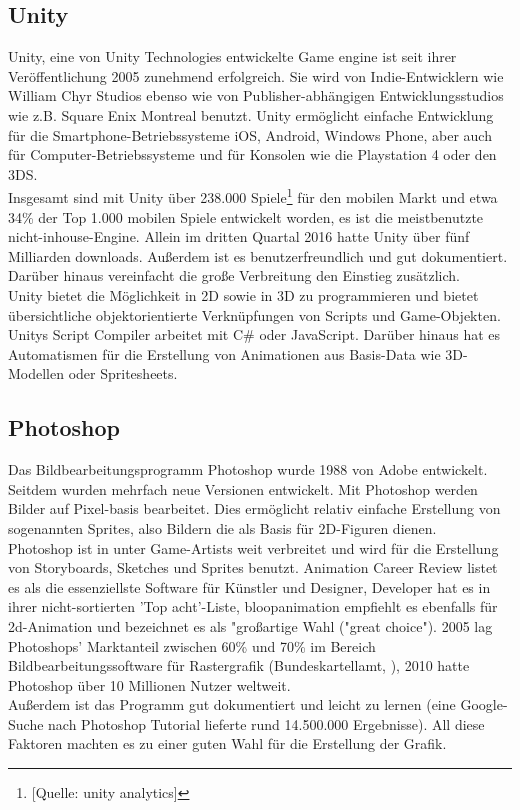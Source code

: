 \documentclass[extern,palatino]{cgBA}
\begin{document}
\subsection{Unity}
Unity, eine von Unity Technologies entwickelte Game engine ist seit ihrer Veröffentlichung 2005 zunehmend erfolgreich. %
Sie wird von Indie-Entwicklern wie William Chyr Studios ebenso wie von Publisher-abhängigen Entwicklungsstudios wie z.B. Square Enix Montreal benutzt. Unity ermöglicht einfache Entwicklung für die Smartphone-Betriebssysteme iOS, Android, Windows Phone, aber auch für Computer-Betriebssysteme und für Konsolen wie die Playstation 4 oder den 3DS.
\\Insgesamt sind mit Unity über 238.000 Spiele\footnote{[Quelle: unity analytics]} für den mobilen Markt %
und etwa 34\% der Top 1.000 mobilen Spiele entwickelt worden, es ist die meistbenutzte nicht-inhouse-Engine. Allein im dritten Quartal 2016 hatte Unity über fünf Milliarden downloads. Außerdem ist es benutzerfreundlich und gut dokumentiert. Darüber hinaus vereinfacht die große Verbreitung den Einstieg zusätzlich.
\\Unity bietet die Möglichkeit in 2D sowie in 3D zu programmieren und bietet übersichtliche objektorientierte Verknüpfungen von Scripts und Game-Objekten. Unitys Script Compiler arbeitet mit C\# oder JavaScript. Darüber hinaus hat es Automatismen für die Erstellung von Animationen aus Basis-Data wie 3D-Modellen oder Spritesheets. 
\newpage 
\subsection{Photoshop}
Das Bildbearbeitungsprogramm Photoshop wurde 1988 von Adobe entwickelt. Seitdem wurden mehrfach neue Versionen entwickelt. Mit Photoshop werden Bilder auf Pixel-basis bearbeitet. Dies ermöglicht relativ einfache Erstellung von sogenannten Sprites, also Bildern die als Basis für 2D-Figuren dienen.
\\
Photoshop ist in unter Game-Artists weit verbreitet und wird für die Erstellung von Storyboards, Sketches und Sprites benutzt. Animation Career Review listet es als die essenziellste Software für Künstler und Designer, Developer hat es in ihrer nicht-sortierten 'Top acht'-Liste, bloopanimation empfiehlt es ebenfalls für 2d-Animation und bezeichnet es als "großartige Wahl ("great choice"). 2005 lag Photoshops' Marktanteil zwischen 60\% und 70\% im Bereich Bildbearbeitungssoftware für Rastergrafik (Bundeskartellamt, %
), 2010 hatte Photoshop über 10 Millionen Nutzer weltweit.
\\
Außerdem ist das Programm gut dokumentiert und leicht zu lernen (eine Google-Suche nach Photoshop Tutorial lieferte rund 14.500.000 Ergebnisse). All diese Faktoren machten es zu einer guten Wahl für die Erstellung der Grafik.
\newpage
\end{document}
